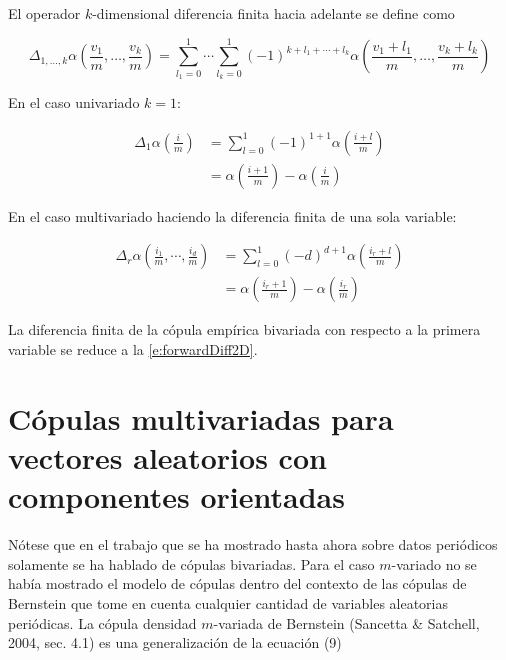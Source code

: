 El operador $k$-dimensional diferencia finita hacia adelante se define como

\begin{equation}
	\Delta_{1,\ldots,k} \alpha
	\left(
		\frac{v_1}{m}, \ldots, \frac{v_k}{m}
	\right)
	=
	\sum_{l_1=0}^1 \cdots \sum_{l_k = 0}^1
	(-1)^{k+l_1+\cdots+l_k}
	\alpha
	\left(
		\frac{v_1 + l_1}{m}, \ldots, \frac{v_k + l_k}{m}
	\right)
\end{equation}

En el caso univariado $k = 1$:

\begin{align}
	\Delta_1 \alpha
	\left(
		\frac{i}{m}
	\right)
	&= \sum_{l = 0}^1 (-1)^{1 + 1}
	\alpha
	\left(
		\frac{i+l}{m}
	\right) \\
	&=
	\alpha \left( \frac{i + 1}{m} \right) - 
	\alpha \left(\frac{i}{m}      \right)
\end{align}

En el caso multivariado haciendo la diferencia finita de una sola variable:

\begin{align}
	\Delta_r
	\alpha
	\left(
		\frac{i_1}{m}, \cdots,\frac{i_d}{m} 
	\right)
	&= \sum_{l = 0}^1 (-d)^{d + 1}
	\alpha
	\left(
		\frac{i_r+l}{m}
	\right) \\
	&=
	\alpha \left( \frac{i_r + 1}{m} \right) - 
	\alpha \left(\frac{i_r}{m}      \right)
\end{align}

La diferencia finita de la c\'opula emp\'irica bivariada con respecto a la primera variable se reduce a la \autoref{e:forwardDiff2D}.


\section{C\'opulas multivariadas para vectores aleatorios con componentes orientadas}\label{s:copMvariateDir}

N\'otese que en el trabajo que se ha mostrado hasta ahora sobre datos peri\'odicos solamente se ha hablado de c\'opulas bivariadas. Para el caso \(m\)-variado no se hab\'ia mostrado el modelo de c\'opulas dentro del contexto de las c\'opulas de Bernstein que tome en cuenta cualquier cantidad de variables aleatorias peri\'odicas. La c\'opula densidad \(m\)-variada de Bernstein (Sancetta \& Satchell, 2004, sec. 4.1) es una generalizaci\'on de la ecuaci\'on (9)


